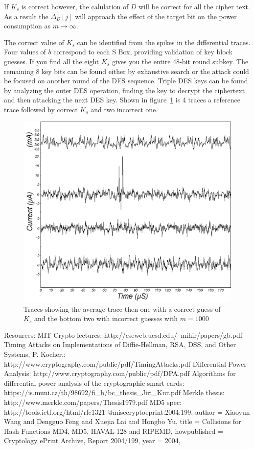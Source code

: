 \documentclass[a4paper,12pt]{article}
\begin{document}
If $K_s$ is correct however, the calulation of $D$ will be correct for all the cipher text. As a result the $\Delta_D[j]$ will approach the effect of the target bit on the power consumption as $m \rightarrow \infty$.

The correct value of $K_s$ can be identified from the spikes in the differential traces. Four values of $b$ correspond to each S Box, providing validation of key block guesses. If you find all the eight $K_s$ gives you the entire 48-bit round subkey. The remaining 8 key bits can be found either by exhaustive search or the attack could be focused on another round of the DES sequence. Triple DES keys can be found by analyzing the outer DES operation, finding the key to decrypt the ciphertext and then attacking the next DES key. Shown in figure~\ref{fig:desResult} is 4 traces a reference trace followed by correct $K_s$ and two incorrect one.

\begin{figure}
    \includegraphics[width=\textwidth]{DPATraces.png}
    \caption{Traces showing the average trace then one with a correct guess of $K_s$ and the bottom two with incorrect guesses with $m = 1000$}
    \label{fig:desResult}
\end{figure}

{\color{red}{TALK ABOUT DPA AGAINST HMAC-MD5}}

Resources:
MIT Crypto lectures: http://cseweb.ucsd.edu/~mihir/papers/gb.pdf
Timing Attacks on Implementations of Diffie-Hellman, RSA, DSS, and Other Systems, P. Kocher.: http://www.cryptography.com/public/pdf/TimingAttacks.pdf
Differential Power Analysis: http://www.cryptography.com/public/pdf/DPA.pdf
Algorithms for differential power analysis of the cryptographic smart cards: https://is.muni.cz/th/98692/fi\_b/bc\_thesis\_Jiri\_Kur.pdf
Merkle thesis: http://www.merkle.com/papers/Thesis1979.pdf 
MD5 spec: http://tools.ietf.org/html/rfc1321 
@misc{cryptoeprint:2004:199,
    author = {Xiaoyun Wang  and Dengguo Feng and Xuejia Lai and Hongbo Yu},
    title = {Collisions for Hash Functions MD4, MD5, HAVAL-128 and RIPEMD},
    howpublished = {Cryptology ePrint Archive, Report 2004/199},
    year = {2004},
}


\end{document}
